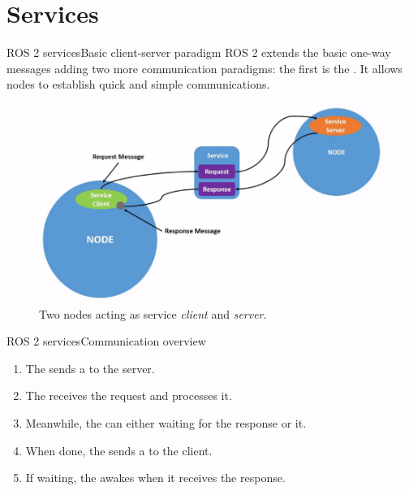 
\section{Services}
\graphicspath{{figs/section2/}}

\begin{frame}{ROS 2 services}{Basic client-server paradigm}
  ROS 2 extends the basic one-way messages adding two more communication paradigms: the first is the . It allows nodes to establish quick and simple  communications.
  \begin{figure}
    \centering
    \includegraphics[scale=.33]{ros2Srv.png}
    \caption{Two nodes acting as service \emph{client} and \emph{server}.}
    \label{fig:ros2srv}
  \end{figure}
\end{frame}
\begin{frame}{ROS 2 services}{Communication overview}
  \begin{enumerate}
    \item The  sends a  to the server.
    \item The  receives the request and processes it.
    \item Meanwhile, the  can either  waiting for the response or  it.
    \item When done, the  sends a  to the client.
    \item If waiting, the  awakes when it receives the response.
  \end{enumerate}
\end{frame}
